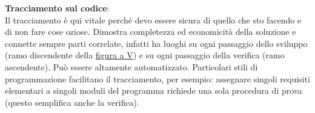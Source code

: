 		\textbf{Tracciamento sul codice}: \\ %
		Il tracciamento è qui vitale perché devo essere sicura di quello che sto facendo e di non fare cose oziose. Dimostra completezza ed economicità della soluzione e connette sempre parti correlate, infatti ha luoghi su ogni passaggio dello sviluppo (ramo discendente della \underline{\hyperref[V]{figura a V}}) e su ogni passaggio della verifica (ramo ascendente). Può essere altamente automatizzato.
		Particolari stili di programmazione facilitano il tracciamento, per esempio: assegnare singoli requisiti elementari a singoli moduli del programma richiede una sola procedura di prova (questo semplifica anche la verifica).
